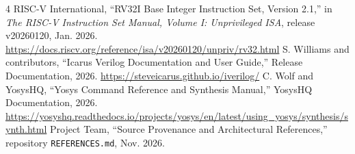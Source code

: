 \documentclass[conference,a4paper]{IEEEtran}
\begin{document}
\begin{thebibliography}{4}
 RISC-V International, ``RV32I Base Integer Instruction Set, Version 2.1,'' in \emph{The RISC-V Instruction Set Manual, Volume I: Unprivileged ISA}, release v20260120, Jan. 2026. \url{https://docs.riscv.org/reference/isa/v20260120/unpriv/rv32.html}
 S. Williams and contributors, ``Icarus Verilog Documentation and User Guide,'' Release Documentation, 2026. \url{https://steveicarus.github.io/iverilog/}
 C. Wolf and YosysHQ, ``Yosys Command Reference and Synthesis Manual,'' YosysHQ Documentation, 2026. \url{https://yosyshq.readthedocs.io/projects/yosys/en/latest/using_yosys/synthesis/synth.html}
 Project Team, ``Source Provenance and Architectural References,'' repository \texttt{REFERENCES.md}, Nov. 2026.
\end{thebibliography}
\end{document}
